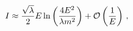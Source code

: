 \begin{equation}
\label{sine} I\approx \frac{\sqrt{\lambda}}{2} E
\ln\left(\frac{4E^2}{\lambda m^2}\right) + {\cal
O}\left(\frac{1}{E}\right)\,,
\end{equation}


